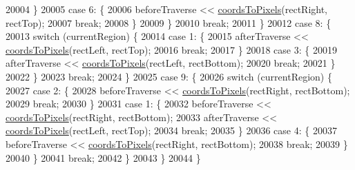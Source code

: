 \begin{DoxyCode}
20004     \}
20005     \textcolor{keywordflow}{case} 6: \{
20006       beforeTraverse << \hyperlink{class_q_c_p_abstract_plottable_ade710a776104b14c1c835168ce1bfc5c}{coordsToPixels}(rectRight, rectTop);
20007       \textcolor{keywordflow}{break};
20008     \}
20009     \}
20010     \textcolor{keywordflow}{break};
20011   \}
20012   \textcolor{keywordflow}{case} 8: \{
20013     \textcolor{keywordflow}{switch} (currentRegion) \{
20014     \textcolor{keywordflow}{case} 1: \{
20015       afterTraverse << \hyperlink{class_q_c_p_abstract_plottable_ade710a776104b14c1c835168ce1bfc5c}{coordsToPixels}(rectLeft, rectTop);
20016       \textcolor{keywordflow}{break};
20017     \}
20018     \textcolor{keywordflow}{case} 3: \{
20019       afterTraverse << \hyperlink{class_q_c_p_abstract_plottable_ade710a776104b14c1c835168ce1bfc5c}{coordsToPixels}(rectLeft, rectBottom);
20020       \textcolor{keywordflow}{break};
20021     \}
20022     \}
20023     \textcolor{keywordflow}{break};
20024   \}
20025   \textcolor{keywordflow}{case} 9: \{
20026     \textcolor{keywordflow}{switch} (currentRegion) \{
20027     \textcolor{keywordflow}{case} 2: \{
20028       beforeTraverse << \hyperlink{class_q_c_p_abstract_plottable_ade710a776104b14c1c835168ce1bfc5c}{coordsToPixels}(rectRight, rectBottom);
20029       \textcolor{keywordflow}{break};
20030     \}
20031     \textcolor{keywordflow}{case} 1: \{
20032       beforeTraverse << \hyperlink{class_q_c_p_abstract_plottable_ade710a776104b14c1c835168ce1bfc5c}{coordsToPixels}(rectRight, rectBottom);
20033       afterTraverse << \hyperlink{class_q_c_p_abstract_plottable_ade710a776104b14c1c835168ce1bfc5c}{coordsToPixels}(rectLeft, rectTop);
20034       \textcolor{keywordflow}{break};
20035     \}
20036     \textcolor{keywordflow}{case} 4: \{
20037       beforeTraverse << \hyperlink{class_q_c_p_abstract_plottable_ade710a776104b14c1c835168ce1bfc5c}{coordsToPixels}(rectRight, rectBottom);
20038       \textcolor{keywordflow}{break};
20039     \}
20040     \}
20041     \textcolor{keywordflow}{break};
20042   \}
20043   \}
20044 \}
\end{DoxyCode}


